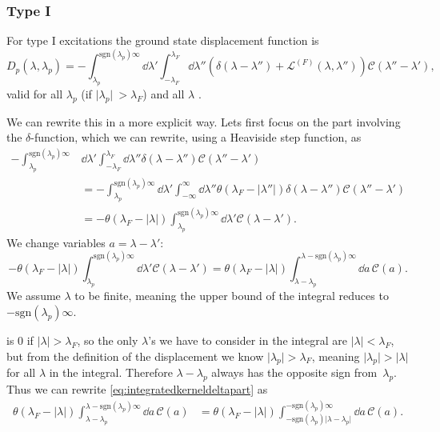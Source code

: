 \documentclass[11pt, a4paper,draft]{report} %
\newcommand{\inversetruncc}{\mathcal{L}}
\newcommand{\kernel}{\mathcal{C}}
\begin{document}
\subsubsection{Type I}
For type I excitations the ground state displacement function is 
\begin{equation}\label{eq:particledisplacement}
	D_p(\lambda, \lambda_p) = - \int_{\lambda_p}^{\textrm{sgn}(\lambda_p)\infty} \dd \lambda' \int_{-\lambda_F}^{\lambda_F} \dd  \lambda'' \left(\delta(\lambda-\lambda'') + \inversetruncc^{(F)}(\lambda,\lambda'') \right)\kernel(\lambda''-\lambda'),
\end{equation}
valid for all \(\lambda_p\) (if \(\lvert \lambda_p \rvert\ > \lambda_F\)) and all \(\lambda\) \cite{tofind}.

\begin{sloppypar}
We can rewrite this in a more explicit way.
Lets first focus on the part involving the \(\delta\)-function, which we can rewrite, using a Heaviside step function, as
\begin{align}
	- \int_{\lambda_p}^{\textrm{sgn}(\lambda_p)\infty} &\dd \lambda' \int_{-\lambda_F}^{\lambda_F} \dd  \lambda'' \delta(\lambda-\lambda'') \kernel(\lambda''-\lambda') \\
	&=- \int_{\lambda_p}^{\textrm{sgn}(\lambda_p)\infty} \dd \lambda' \int_{-\infty}^{\infty} \dd \lambda'' \theta(\lambda_F - \lvert \lambda'' \rvert)  \delta(\lambda-\lambda'') \kernel(\lambda''-\lambda')\\
	&= - \theta(\lambda_F - \lvert \lambda \rvert) \int_{\lambda_p}^{\textrm{sgn}(\lambda_p)\infty} \dd \lambda'     \kernel(\lambda-\lambda').
\end{align}
We change variables \(a=\lambda-\lambda'\):
\begin{equation}\label{eq:integratedkerneldeltapart}
	- \theta(\lambda_F - \lvert \lambda \rvert) \int_{\lambda_p}^{\textrm{sgn}(\lambda_p)\infty} \dd \lambda'     \kernel(\lambda-\lambda')=
	 \theta(\lambda_F - \lvert \lambda \rvert) \int_{\lambda-\lambda_p}^{\lambda - \textrm{sgn}(\lambda_p)\infty} \dd a\,\kernel(a).
\end{equation}
We assume \(\lambda\) to be finite, meaning the upper bound of the integral reduces to \(-\textrm{sgn}(\lambda_p)\infty\).
\end{sloppypar}

 is 0 if \(\lvert \lambda\rvert > \lambda_F\), so the only \(\lambda\)'s we have to consider in the integral are \(\lvert\lambda\rvert< \lambda_F\), but from the definition of the displacement we know \(\lvert\lambda_p\rvert >\lambda_F\), meaning \(\lvert\lambda_p\rvert > \lvert\lambda\rvert\) for all \(\lambda\) in the integral.
Therefore \(\lambda-\lambda_p\) always has the opposite sign from~\(\lambda_p\).
Thus we can rewrite \cref{eq:integratedkerneldeltapart} as
\begin{align}
	\theta(\lambda_F - \lvert \lambda \rvert) \int_{\lambda-\lambda_p}^{\lambda - \textrm{sgn}(\lambda_p)\infty} \dd a\,\kernel(a) &=
	\theta(\lambda_F - \lvert \lambda \rvert) \int_{-\textrm{sgn}(\lambda_p)\lvert\lambda-\lambda_p\rvert}^{ - \textrm{sgn}(\lambda_p)\infty} \dd a\,\kernel(a).
\end{align}
\end{document}
